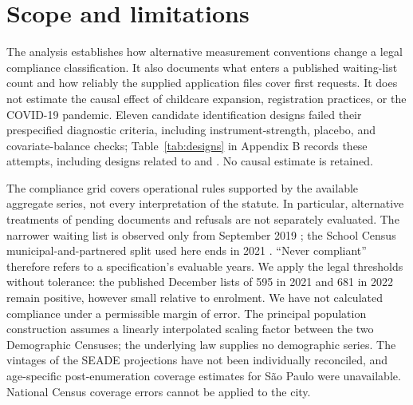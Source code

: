 
\section{Scope and limitations}\label{sec:scope}

The analysis establishes how alternative measurement conventions change a legal compliance classification. It also documents what enters a published waiting-list count and how reliably the supplied application files cover first requests. It does not estimate the causal effect of childcare expansion, registration practices, or the COVID-19 pandemic. Eleven candidate identification designs failed their prespecified diagnostic criteria, including instrument-strength, placebo, and covariate-balance checks; Table~\ref{tab:designs} in Appendix B records these attempts, including designs related to \citet{soares2021ecd} and \citet{schneider2023reforma}. No causal estimate is retained.

The compliance grid covers operational rules supported by the available aggregate series, not every interpretation of the statute. In particular, alternative treatments of pending documents and refusals are not separately evaluated. The narrower waiting list is observed only from September 2019 \citep{sme_demanda_escolar}; the School Census municipal-and-partnered split used here ends in 2021 \citep{inep_censo_escolar_c}. ``Never compliant'' therefore refers to a specification's evaluable years. We apply the legal thresholds without tolerance: the published December lists of 595 in 2021 and 681 in 2022 \citep{sme_demanda_escolar} remain positive, however small relative to enrolment. We have not calculated compliance under a permissible margin of error. The principal population construction assumes a linearly interpolated scaling factor between the two Demographic Censuses; the underlying law supplies no demographic series. The vintages of the SEADE projections \citep{seade_idade_escolar} have not been individually reconciled, and age-specific post-enumeration coverage estimates for S\~ao Paulo were unavailable. National Census coverage errors \citep{agenciabrasil2024ppe} cannot be applied to the city.

